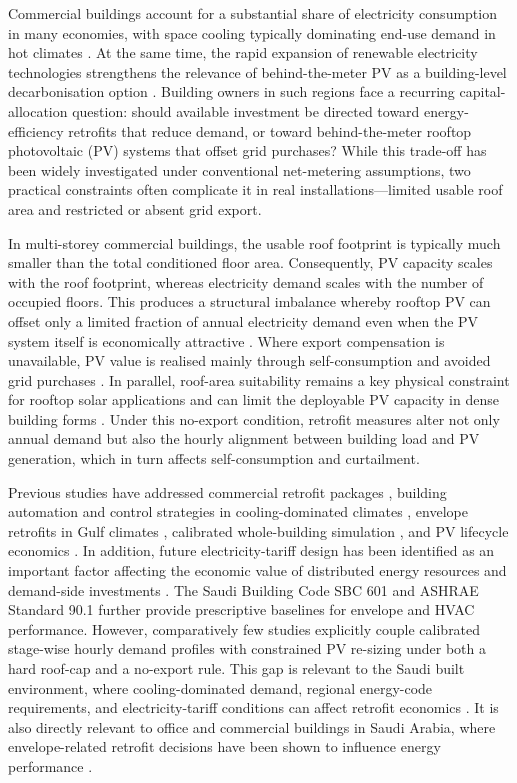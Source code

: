 \documentclass[journal,fleqn]{IEEEtran}
\begin{document}
Commercial buildings account for a substantial share of electricity consumption in many economies, with space cooling typically dominating end-use demand in hot climates \cite{ref01}. At the same time, the rapid expansion of renewable electricity technologies strengthens the relevance of behind-the-meter PV as a building-level decarbonisation option \cite{ref02}. Building owners in such regions face a recurring capital-allocation question: should available investment be directed toward energy-efficiency retrofits that reduce demand, or toward behind-the-meter rooftop photovoltaic (PV) systems that offset grid purchases? While this trade-off has been widely investigated under conventional net-metering assumptions, two practical constraints often complicate it in real installations---limited usable roof area and restricted or absent grid export.


In multi-storey commercial buildings, the usable roof footprint is typically much smaller than the total conditioned floor area. Consequently, PV capacity scales with the roof footprint, whereas electricity demand scales with the number of occupied floors. This produces a structural imbalance whereby rooftop PV can offset only a limited fraction of annual electricity demand even when the PV system itself is economically attractive \cite{ref03,ref04}. Where export compensation is unavailable, PV value is realised mainly through self-consumption and avoided grid purchases \cite{ref05}. In parallel, roof-area suitability remains a key physical constraint for rooftop solar applications and can limit the deployable PV capacity in dense building forms \cite{ref06}. Under this no-export condition, retrofit measures alter not only annual demand but also the hourly alignment between building load and PV generation, which in turn affects self-consumption and curtailment.


Previous studies have addressed commercial retrofit packages \cite{ref07,ref08}, building automation and control strategies in cooling-dominated climates \cite{ref09,ref10,ref11}, envelope retrofits in Gulf climates \cite{ref12,ref13}, calibrated whole-building simulation \cite{ref14,ref15}, and PV lifecycle economics \cite{ref05,ref16}. In addition, future electricity-tariff design has been identified as an important factor affecting the economic value of distributed energy resources and demand-side investments \cite{ref17}. The Saudi Building Code SBC 601 \cite{ref18} and ASHRAE Standard 90.1 \cite{ref19} further provide prescriptive baselines for envelope and HVAC performance. However, comparatively few studies explicitly couple calibrated stage-wise hourly demand profiles with constrained PV re-sizing under both a hard roof-cap and a no-export rule. This gap is relevant to the Saudi built environment, where cooling-dominated demand, regional energy-code requirements, and electricity-tariff conditions can affect retrofit economics \cite{ref20,ref21}. It is also directly relevant to office and commercial buildings in Saudi Arabia, where envelope-related retrofit decisions have been shown to influence energy performance \cite{ref12}.
\end{document}
